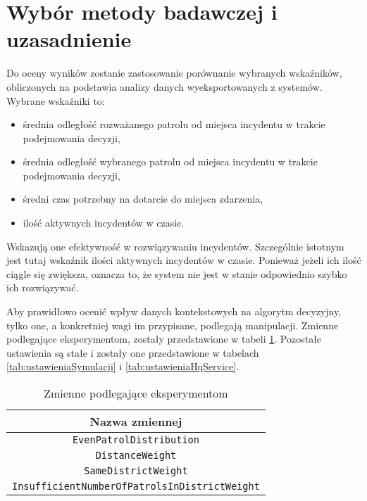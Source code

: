 \section{Wybór metody badawczej i uzasadnienie}
\label{sec:wyborMetodyBadawczejIUzasadnienie}

\par Do oceny wyników zostanie zastosowanie porównanie wybranych wskaźników, obliczonych na podstawia analizy danych wyeksportowanych z systemów. Wybrane wskaźniki to:
\begin{itemize}
    \item średnia odległość rozważanego patrolu od miejsca incydentu w trakcie podejmowania decyzji,
    \item średnia odległość wybranego patrolu od miejsca incydentu w trakcie podejmowania decyzji,
    \item średni czas potrzebny na dotarcie do miejsca zdarzenia,
    \item ilość aktywnych incydentów w czasie.
\end{itemize}
Wskazują one efektywność w rozwiązywaniu incydentów. Szczególnie istotnym jest tutaj wskaźnik ilości aktywnych incydentów w czasie. Ponieważ jeżeli ich ilość ciągle się zwiększa, oznacza to, że system nie jest w stanie odpowiednio szybko ich rozwiązywać.

\par Aby prawidłowo ocenić wpływ danych kontekstowych na algorytm decyzyjny, tylko one, a konkretniej wagi im przypisane, podlegają manipulacji. Zmienne podlegające eksperymentom, zostały przedstawione w tabeli \ref{tab:zmiennePodlegająceEksperymentom}. Pozostałe ustawienia są stałe i zostały one przedstawione w tabelach \ref{tab:ustawieniaSymulacji} i \ref{tab:ustawieniaHqService}.

\begin{table}[H]
    \centering
    \begin{tabular}{|c|}
        \hline
        Nazwa zmiennej \\
        \hline
        \hline
         \texttt{EvenPatrolDistribution} \\
         \hline
         \texttt{DistanceWeight} \\
         \hline
         \texttt{SameDistrictWeight} \\
         \hline
         \texttt{InsufficientNumberOfPatrolsInDistrictWeight} \\
         \hline
    \end{tabular}
    \caption{Zmienne podlegające eksperymentom}
    \label{tab:zmiennePodlegająceEksperymentom}
\end{table}

